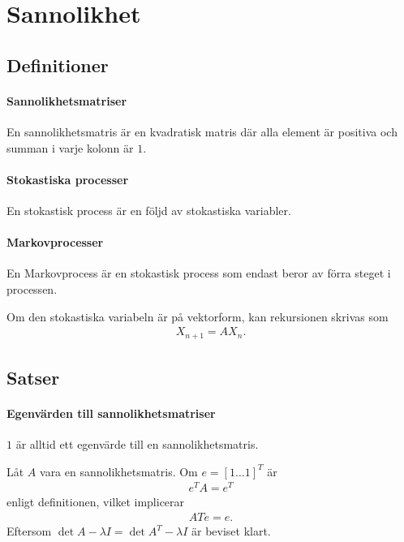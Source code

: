 \section{Sannolikhet}

\subsection{Definitioner}

\paragraph{Sannolikhetsmatriser}
En sannolikhetsmatris är en kvadratisk matris där alla element är positiva och summan i varje kolonn är $1$.

\paragraph{Stokastiska processer}
En stokastisk process är en följd av stokastiska variabler.

\paragraph{Markovprocesser}
En Markovprocess är en stokastisk process som endast beror av förra steget i processen.

Om den stokastiska variabeln är på vektorform, kan rekursionen skrivas som
\begin{align*}
	X_{n + 1} = AX_{n}.
\end{align*}

\subsection{Satser}

\paragraph{Egenvärden till sannolikhetsmatriser}
$1$ är alltid ett egenvärde till en sannolikhetsmatris.

\proof
Låt $A$ vara en sannolikhetsmatris. Om $e = [1 \dots 1]^{T}$ är
\begin{align*}
	e^{T}A = e^{T}
\end{align*}
enligt definitionen, vilket implicerar
\begin{align*}
	A{T}e = e.
\end{align*}
Eftersom $\det{A - \lambda I} = \det{A^{T} - \lambda I}$ är beviset klart.

